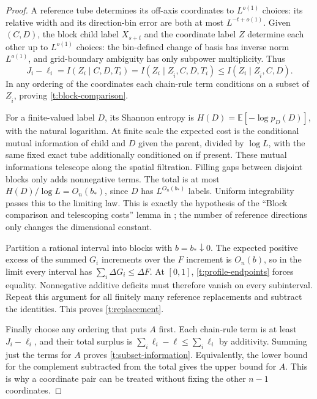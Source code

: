 \begin{proof}
A reference tube determines its off-axis coordinates to $L^{o(1)}$
choices: its relative width and its direction-bin error are both at
most $L^{-t+o(1)}$.  Given $(C,D)$, the block child label
$X_{s+t}$ and the coordinate label $Z$ determine each other up to
$L^{o(1)}$ choices: the bin-defined change of basis has inverse norm
$L^{o(1)}$, and grid-boundary ambiguity has only subpower multiplicity.
Thus
\[
 J_i-\ell_i=I(Z_i\mid C,D,T_i)
 =I(Z_i\mid Z_{\widehat i},C,D,T_i)
 \le I(Z_i\mid Z_{\widehat i},C,D).
\]
In any ordering of the coordinates each chain-rule term conditions on
a subset of $Z_{\widehat i}$, proving \eqref{t:block-comparison}.

For a finite-valued label $D$, its Shannon entropy is
$H(D)=\mathbb E[-\log p_D(D)]$, with the natural logarithm.
At finite scale the expected cost is the conditional mutual information
of child and $D$ given the parent, divided by $\log L$, with the same
fixed exact tube additionally conditioned on if present.  These mutual
informations telescope along the spatial filtration.  Filling gaps
between disjoint blocks only adds nonnegative terms.  The total is at
most $H(D)/\log L=O_n(b_*)$, since $D$ has $L^{O_n(b_*)}$ labels.
Uniform integrability passes this to the limiting law.  This is exactly
the hypothesis of the ``Block comparison and telescoping costs'' lemma
in \citet[Section~3]{PSE2026}; the number of reference directions only
changes the dimensional constant.

Partition a rational interval into blocks with $b=b_*\downarrow0$.
The expected positive excess of the summed $G_i$ increments over the
$F$ increment is $O_n(b)$, so in the limit every interval has
$\sum_i\Delta G_i\le\Delta F$.  At $[0,1]$, \eqref{t:profile-endpoints}
forces equality.  Nonnegative additive deficits must therefore vanish
on every subinterval.  Repeat this argument for all finitely many
reference replacements and subtract the identities.  This proves
\eqref{t:replacement}.

Finally choose any ordering that puts $A$ first.  Each chain-rule term
is at least $J_i-\ell_i$, and their total surplus is
$\sum_i\ell_i-\ell\le\sum_i\ell_i$ by additivity.  Summing just the
terms for $A$ proves \eqref{t:subset-information}.  Equivalently, the
lower bound for the complement subtracted from the total gives the
upper bound for $A$.  This is why a coordinate pair can be treated
without fixing the other $n-1$ coordinates.
\end{proof}

